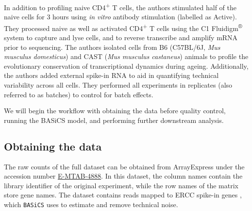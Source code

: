\documentclass[9pt,a4paper,]{extarticle}
\begin{document}
In addition to profiling naive CD4\textsuperscript{+} T cells, the authors stimulated half
of the naive cells for 3 hours using \emph{in vitro} antibody stimulation (labelled
as Active).
They processed naive as well as activated CD4\textsuperscript{+} T cells using the
C1 Fluidigm\textsuperscript{®} system to capture and lyse cells, and to reverse transcribe
and amplify mRNA prior to sequencing.
The authors isolated cells from B6 (C57BL/6J, \emph{Mus musculus domesticus}) and
CAST (\emph{Mus musculus castaneus}) animals to profile the evolutionary conservation
of transcriptional dynamics during ageing.
Additionally, the authors added external spike-in RNA to aid in quantifying
technical variability across all cells. They performed all experiments in
replicates (also referred to as batches) to control for batch effects.

We will begin the workflow with obtaining the data before quality control,
running the BASiCS model, and performing further downstream analysis.

\hypertarget{obtaining-the-data}{%
\subsection{Obtaining the data}\label{obtaining-the-data}}

The raw counts of the full dataset can be obtained from ArrayExpress under the
accession number
\href{https://www.ebi.ac.uk/arrayexpress/experiments/E-MTAB-4888/}{E-MTAB-4888}.
In this dataset, the column names contain the library identifier of the original
experiment, while the row names of the matrix store gene names.
The dataset contains reads mapped to ERCC spike-in genes \citep{Rna2005}, which
\texttt{BASiCS} uses to estimate and remove technical noise.

{\small}
\end{document}

